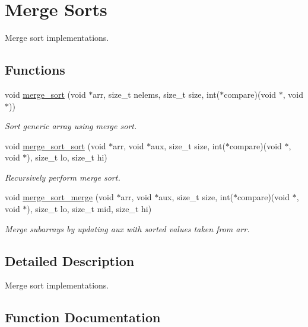 \hypertarget{group__MergeSort}{}\section{Merge Sorts}
\label{group__MergeSort}


Merge sort implementations.  


\subsection*{Functions}
\begin{DoxyCompactItemize}
\item 
void \hyperlink{group__MergeSort_gae79ad9eeaa55ba9f59fd89f9cdeb5924}{merge\+\_\+sort} (void $\ast$arr, size\+\_\+t nelems, size\+\_\+t size, int($\ast$compare)(void $\ast$, void $\ast$))
\begin{DoxyCompactList}\small\item\em Sort generic array using merge sort. \end{DoxyCompactList}\item 
void \hyperlink{group__MergeSort_ga530d5666451d2ecee0dd5fd88cd7e88c}{merge\+\_\+sort\+\_\+sort} (void $\ast$arr, void $\ast$aux, size\+\_\+t size, int($\ast$compare)(void $\ast$, void $\ast$), size\+\_\+t lo, size\+\_\+t hi)
\begin{DoxyCompactList}\small\item\em Recursively perform merge sort. \end{DoxyCompactList}\item 
void \hyperlink{group__MergeSort_ga7018ae4bb54261fff3f754fd8e6b6bc4}{merge\+\_\+sort\+\_\+merge} (void $\ast$arr, void $\ast$aux, size\+\_\+t size, int($\ast$compare)(void $\ast$, void $\ast$), size\+\_\+t lo, size\+\_\+t mid, size\+\_\+t hi)
\begin{DoxyCompactList}\small\item\em Merge subarrays by updating aux with sorted values taken from arr. \end{DoxyCompactList}\end{DoxyCompactItemize}


\subsection{Detailed Description}
Merge sort implementations. 



\subsection{Function Documentation}
\mbox{\label{group__MergeSort_gae79ad9eeaa55ba9f59fd89f9cdeb5924}} 
